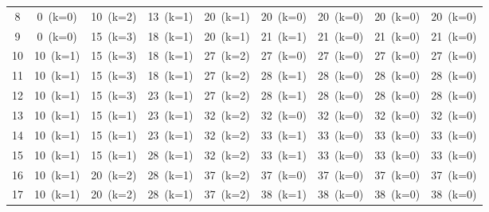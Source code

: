 \documentclass[12pt]{article}
\begin{document}
\begin{landscape}
\begin{longtable}{ccccccccc}
8 & \cellcolor{red!20}0~(k=0) & \cellcolor{green!40}10~(k=2) & \cellcolor{green!40}13~(k=1) & \cellcolor{green!40}20~(k=1) & \cellcolor{yellow!50}20~(k=0) & \cellcolor{red!20}20~(k=0) & \cellcolor{red!20}20~(k=0) & \cellcolor{red!20}20~(k=0) \\
9 & \cellcolor{red!20}0~(k=0) & \cellcolor{green!40}15~(k=3) & \cellcolor{green!40}18~(k=1) & \cellcolor{green!40}20~(k=1) & \cellcolor{green!40}21~(k=1) & \cellcolor{red!20}21~(k=0) & \cellcolor{red!20}21~(k=0) & \cellcolor{red!20}21~(k=0) \\
10 & \cellcolor{green!40}10~(k=1) & \cellcolor{green!40}15~(k=3) & \cellcolor{green!40}18~(k=1) & \cellcolor{green!40}27~(k=2) & \cellcolor{red!20}27~(k=0) & \cellcolor{red!20}27~(k=0) & \cellcolor{red!20}27~(k=0) & \cellcolor{red!20}27~(k=0) \\
11 & \cellcolor{green!40}10~(k=1) & \cellcolor{green!40}15~(k=3) & \cellcolor{green!40}18~(k=1) & \cellcolor{green!40}27~(k=2) & \cellcolor{green!40}28~(k=1) & \cellcolor{red!20}28~(k=0) & \cellcolor{red!20}28~(k=0) & \cellcolor{red!20}28~(k=0) \\
12 & \cellcolor{green!40}10~(k=1) & \cellcolor{green!40}15~(k=3) & \cellcolor{green!40}23~(k=1) & \cellcolor{green!40}27~(k=2) & \cellcolor{green!40}28~(k=1) & \cellcolor{red!20}28~(k=0) & \cellcolor{red!20}28~(k=0) & \cellcolor{red!20}28~(k=0) \\
13 & \cellcolor{green!40}10~(k=1) & \cellcolor{yellow!50}15~(k=1) & \cellcolor{green!40}23~(k=1) & \cellcolor{green!40}32~(k=2) & \cellcolor{red!20}32~(k=0) & \cellcolor{red!20}32~(k=0) & \cellcolor{red!20}32~(k=0) & \cellcolor{red!20}32~(k=0) \\
14 & \cellcolor{green!40}10~(k=1) & \cellcolor{yellow!50}15~(k=1) & \cellcolor{green!40}23~(k=1) & \cellcolor{green!40}32~(k=2) & \cellcolor{green!40}33~(k=1) & \cellcolor{red!20}33~(k=0) & \cellcolor{red!20}33~(k=0) & \cellcolor{red!20}33~(k=0) \\
15 & \cellcolor{green!40}10~(k=1) & \cellcolor{yellow!50}15~(k=1) & \cellcolor{green!40}28~(k=1) & \cellcolor{green!40}32~(k=2) & \cellcolor{green!40}33~(k=1) & \cellcolor{red!20}33~(k=0) & \cellcolor{red!20}33~(k=0) & \cellcolor{red!20}33~(k=0) \\
16 & \cellcolor{green!40}10~(k=1) & \cellcolor{green!40}20~(k=2) & \cellcolor{green!40}28~(k=1) & \cellcolor{green!40}37~(k=2) & \cellcolor{red!20}37~(k=0) & \cellcolor{red!20}37~(k=0) & \cellcolor{red!20}37~(k=0) & \cellcolor{red!20}37~(k=0) \\
17 & \cellcolor{green!40}10~(k=1) & \cellcolor{green!40}20~(k=2) & \cellcolor{green!40}28~(k=1) & \cellcolor{green!40}37~(k=2) & \cellcolor{green!40}38~(k=1) & \cellcolor{red!20}38~(k=0) & \cellcolor{red!20}38~(k=0) & \cellcolor{red!20}38~(k=0) \\

\end{longtable}
\end{landscape}
\end{document}
